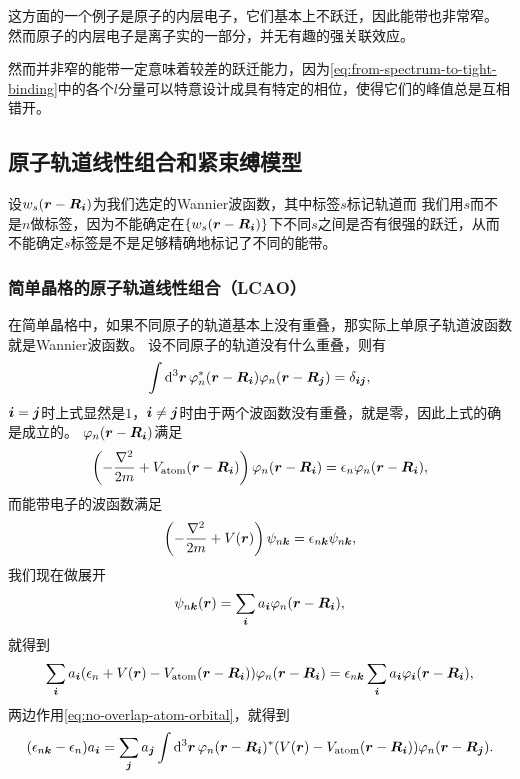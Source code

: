 这方面的一个例子是原子的内层电子，它们基本上不跃迁，因此能带也非常窄。
然而原子的内层电子是离子实的一部分，并无有趣的强关联效应。

然而并非窄的能带一定意味着较差的跃迁能力，因为\eqref{eq:from-spectrum-to-tight-binding}中的各个$l$分量可以特意设计成具有特定的相位，使得它们的峰值总是互相错开。

\subsection{原子轨道线性组合和紧束缚模型}\label{sec:tight-binding-hopping}

设$w_{s}(\vb*{r} - \vb*{R}_{\vb*{i}})$为我们选定的Wannier波函数，其中标签$s$标记轨道而
我们用$s$而不是$n$做标签，因为不能确定在$\{w_{s}(\vb*{r} - \vb*{R}_{\vb*{i}})\}$下不同$s$之间是否有很强的跃迁，从而不能确定$s$标签是不是足够精确地标记了不同的能带。

\subsubsection{简单晶格的原子轨道线性组合（LCAO）} 

在简单晶格中，如果不同原子的轨道基本上没有重叠，那实际上单原子轨道波函数就是Wannier波函数。
设不同原子的轨道没有什么重叠，则有
\begin{equation}
    \int \dd[3]{\vb*{r}} \varphi_n^*(\vb*{r} - \vb*{R}_{\vb*{i}}) \varphi_n(\vb*{r} - \vb*{R}_{\vb*{j}}) = \delta_{\vb*{i} \vb*{j}},
    \label{eq:no-overlap-atom-orbital}
\end{equation}
$\vb*{i}=\vb*{j}$时上式显然是$1$，$\vb*{i} \neq \vb*{j}$时由于两个波函数没有重叠，就是零，因此上式的确是成立的。
$\varphi_n(\vb*{r} - \vb*{R}_{\vb*{i}})$满足
\begin{equation}
    \left( - \frac{\laplacian}{2m} + V_\text{atom} (\vb*{r} - \vb*{R}_{\vb*{i}}) \right) \varphi_n(\vb*{r} - \vb*{R}_{\vb*{i}}) = \epsilon_n \varphi_n(\vb*{r} - \vb*{R}_{\vb*{i}}),
\end{equation}
而能带电子的波函数满足
\begin{equation}
    \left( - \frac{\laplacian}{2m} + V (\vb*{r}) \right) \psi_{n \vb*{k}} = \epsilon_{n \vb*{k}} \psi_{n \vb*{k}},
\end{equation}
我们现在做展开
\begin{equation}
    \psi_{n \vb*{k}}(\vb*{r}) = \sum_{\vb*{i}} a_{\vb*{i}} \varphi_n(\vb*{r} - \vb*{R}_{\vb*{i}}),
\end{equation}
就得到
\[
    \sum_{\vb*{i}} a_{\vb*{i}} (\epsilon_n + V(\vb*{r}) - V_\text{atom}(\vb*{r} - \vb*{R}_{\vb*{i}})) \varphi_n(\vb*{r} - \vb*{R}_{\vb*{i}}) = \epsilon_{n \vb*{k}} \sum_{\vb*{i}} a_{\vb*{i}} \varphi_{\vb*{i}}(\vb*{r} - \vb*{R}_{\vb*{i}}),
\]
两边作用\eqref{eq:no-overlap-atom-orbital}，就得到
\begin{equation}
    (\epsilon_{n \vb*{k}} - \epsilon_n) a_{\vb*{i}} = \sum_{\vb*{j}} a_{\vb*{j}} \int \dd[3]{\vb*{r}} \varphi_n(\vb*{r} - \vb*{R}_{\vb*{i}})^* ( V(\vb*{r}) - V_\text{atom}(\vb*{r} - \vb*{R}_{\vb*{i}})) \varphi_n(\vb*{r} - \vb*{R}_{\vb*{j}}).
\end{equation}

